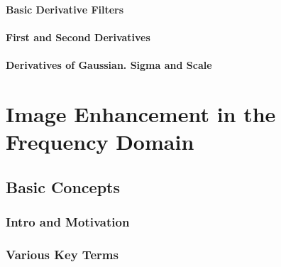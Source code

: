 \paragraph{Basic Derivative Filters} 
\label{booksection_38_Basic_Derivative_Filters}

\paragraph{First and Second Derivatives} 
\label{booksection_39_First_and_Second_Derivatives}

\paragraph{Derivatives of Gaussian. Sigma and Scale} 
\label{booksection_40_Derivatives_of_Gaussian_Sigma_and_Scale}

\section{Image Enhancement in the Frequency Domain} 
\label{booksection_41_Image_Enhancement_in_the_Frequency_Domain}
\subsection{Basic Concepts} 
\label{booksection_42_Basic_Concepts}
\subsubsection{Intro and Motivation} 
\label{booksection_43_Intro_and_Motivation}

\subsubsection{Various Key Terms} 
\label{booksection_44_Various_Key_Terms}

